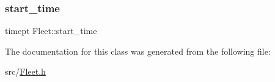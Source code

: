 \mbox{\label{class_fleet_a287f9cf06613b5ad1b511cc82216d42b}} 
\subsubsection{\texorpdfstring{start\+\_\+time}{start\_time}}
{\footnotesize\ttfamily timept Fleet\+::start\+\_\+time}



The documentation for this class was generated from the following file\+:\begin{DoxyCompactItemize}
\item 
src/\hyperlink{_fleet_8h}{Fleet.\+h}\end{DoxyCompactItemize}
